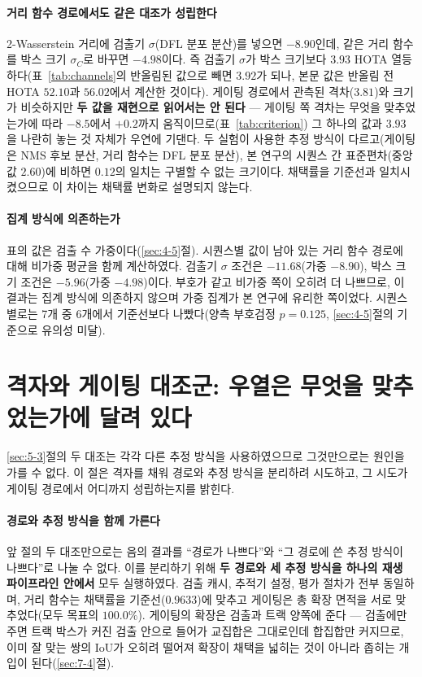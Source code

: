\documentclass[12pt,a4paper,oneside]{report}
\begin{document}
\paragraph{거리 함수 경로에서도 같은 대조가 성립한다} 2-Wasserstein 거리에 검출기 $\sigma$(DFL 분포 분산)를 넣으면 $-8.90$인데, 같은 거리 함수를 박스 크기 $\sigma_C$로 바꾸면 $-4.98$이다. 즉 검출기 $\sigma$가 박스 크기보다 $3.93$ HOTA 열등하다(표~\ref{tab:channels}의 반올림된 값으로 빼면 $3.92$가 되나, 본문 값은 반올림 전 HOTA $52.10$과 $56.02$에서 계산한 것이다). 게이팅 경로에서 관측된 격차($3.81$)와 크기가 비슷하지만 \textbf{두 값을 재현으로 읽어서는 안 된다} --- 게이팅 쪽 격차는 무엇을 맞추었는가에 따라 $-8.5$에서 $+0.2$까지 움직이므로(표~\ref{tab:criterion}) 그 하나의 값과 $3.93$을 나란히 놓는 것 자체가 우연에 기댄다. 두 실험이 사용한 추정 방식이 다르고(게이팅은 NMS 후보 분산, 거리 함수는 DFL 분포 분산), 본 연구의 시퀀스 간 표준편차(중앙값 $2.60$)에 비하면 $0.12$의 일치는 구별할 수 없는 크기이다. 채택률을 기준선과 일치시켰으므로 이 차이는 채택률 변화로 설명되지 않는다.

\paragraph{집계 방식에 의존하는가} 표의 값은 검출 수 가중이다(\ref{sec:4-5}절). 시퀀스별 값이 남아 있는 거리 함수 경로에 대해 비가중 평균을 함께 계산하였다. 검출기 $\sigma$ 조건은 \textbf{$-11.68$}(가중 $-8.90$), 박스 크기 조건은 $-5.96$(가중 $-4.98$)이다. 부호가 같고 비가중 쪽이 오히려 더 나쁘므로, 이 결과는 집계 방식에 의존하지 않으며 가중 집계가 본 연구에 유리한 쪽이었다. 시퀀스별로는 7개 중 6개에서 기준선보다 나빴다(양측 부호검정 $p = 0.125$, \ref{sec:4-5}절의 기준으로 유의성 미달).

\section{격자와 게이팅 대조군: 우열은 무엇을 맞추었는가에 달려 있다}\label{sec:5-4}

\ref{sec:5-3}절의 두 대조는 각각 다른 추정 방식을 사용하였으므로 그것만으로는 원인을 가를 수 없다. 이 절은 격자를 채워 경로와 추정 방식을 분리하려 시도하고, 그 시도가 게이팅 경로에서 어디까지 성립하는지를 밝힌다.

\paragraph{경로와 추정 방식을 함께 가른다} 앞 절의 두 대조만으로는 음의 결과를 ``경로가 나쁘다''와 ``그 경로에 쓴 추정 방식이 나쁘다''로 나눌 수 없다. 이를 분리하기 위해 \textbf{두 경로와 세 추정 방식을 하나의 재생 파이프라인 안에서} 모두 실행하였다. 검출 캐시, 추적기 설정, 평가 절차가 전부 동일하며, 거리 함수는 채택률을 기준선($0.9633$)에 맞추고 게이팅은 총 확장 면적을 서로 맞추었다(모두 목표의 $100.0\%$). 게이팅의 확장은 검출과 트랙 양쪽에 준다 --- 검출에만 주면 트랙 박스가 커진 검출 안으로 들어가 교집합은 그대로인데 합집합만 커지므로, 이미 잘 맞는 쌍의 IoU가 오히려 떨어져 확장이 채택을 넓히는 것이 아니라 좁히는 개입이 된다(\ref{sec:7-4}절).
\end{document}
